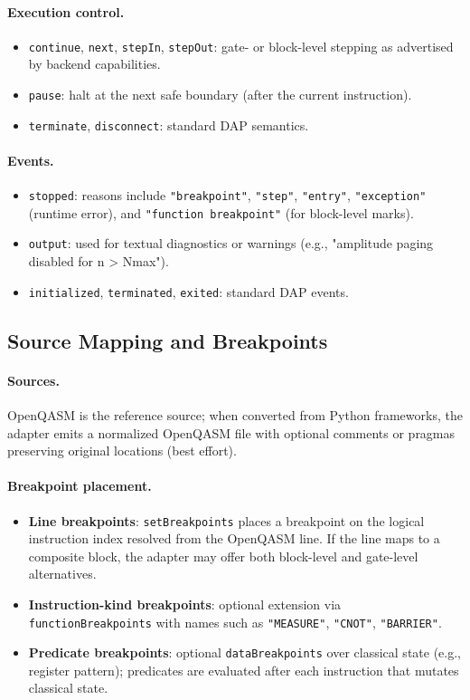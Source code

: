 \documentclass[12pt]{article}
\begin{document}
\paragraph{Execution control.}
\begin{itemize}
  \item \texttt{continue}, \texttt{next}, \texttt{stepIn}, \texttt{stepOut}: gate- or block-level stepping as advertised by backend capabilities.
  \item \texttt{pause}: halt at the next safe boundary (after the current instruction).
  \item \texttt{terminate}, \texttt{disconnect}: standard DAP semantics.
\end{itemize}

\paragraph{Events.}
\begin{itemize}
  \item \texttt{stopped}: reasons include \texttt{"breakpoint"}, \texttt{"step"}, \texttt{"entry"}, \texttt{"exception"} (runtime error), and \texttt{"function breakpoint"} (for block-level marks).
  \item \texttt{output}: used for textual diagnostics or warnings (e.g., "amplitude paging disabled for n > Nmax").
  \item \texttt{initialized}, \texttt{terminated}, \texttt{exited}: standard DAP events.
\end{itemize}

\subsection{Source Mapping and Breakpoints}

\paragraph{Sources.}
OpenQASM is the reference source; when converted from Python frameworks, the adapter emits a normalized OpenQASM file with optional comments or pragmas preserving original locations (best effort).

\paragraph{Breakpoint placement.}
\begin{itemize}
  \item \textbf{Line breakpoints}: \texttt{setBreakpoints} places a breakpoint on the logical instruction index resolved from the OpenQASM line. If the line maps to a composite block, the adapter may offer both block-level and gate-level alternatives.
  \item \textbf{Instruction-kind breakpoints}: optional extension via \texttt{functionBreakpoints} with names such as \texttt{"MEASURE"}, \texttt{"CNOT"}, \texttt{"BARRIER"}.
  \item \textbf{Predicate breakpoints}: optional \texttt{dataBreakpoints} over classical state (e.g., register pattern); predicates are evaluated after each instruction that mutates classical state.
\end{itemize}
\end{document}
